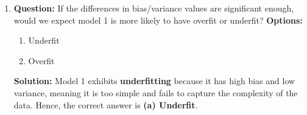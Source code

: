 \documentclass{article}
\begin{document}
\begin{enumerate}
    \textbf{Solution:} \newline
    We approximate variance as the variance of the model’s predictions.
    
    Variance is calculated as the average of the squared differences between each model’s predictions and its mean prediction.
    
    \textbf{Model 1}:
    \[
    \text{Variance for Model 1} = \frac{(4.8 - 4.92)^2 + (4.7 - 4.92)^2 + (4.9 - 4.92)^2 + (5.0 - 4.92)^2 + (5.2 - 4.92)^2}{5} = 0.03
    \]

    \textbf{Model 2}:
    \[
    \text{Variance for Model 2} = \frac{(5.2 - 5.52)^2 + (5.3 - 5.52)^2 + (5.5 - 5.52)^2 + (5.7 - 5.52)^2 + (5.9 - 5.52)^2}{5} = 0.07
    \]

    \textbf{Model 3}:
    \[
    \text{Variance for Model 3} = \frac{(5.0 - 7.1)^2 + (6.0 - 7.1)^2 + (7.2 - 7.1)^2 + (8.0 - 7.1)^2 + (9.3 - 7.1)^2}{5} = 2.26
    \]
    
    The correct answer is \textbf{(d) Model 1: 0.03, Model 2: 0.07, Model 3: 2.26}.

    \item \textbf{Question:} \newline
    If the differences in bias/variance values are significant enough, would we expect model 1 is more likely to have overfit or underfit?
    \newline \newline
    \textbf{Options:}
    \begin{enumerate}
        \item Underfit
        \item Overfit
    \end{enumerate}
    
    \textbf{Solution:} \newline
    Model 1 exhibits \textbf{underfitting} because it has high bias and low variance, meaning it is too simple and fails to capture the complexity of the data. Hence, the correct answer is \textbf{(a) Underfit}.
\end{enumerate}
\end{document}
